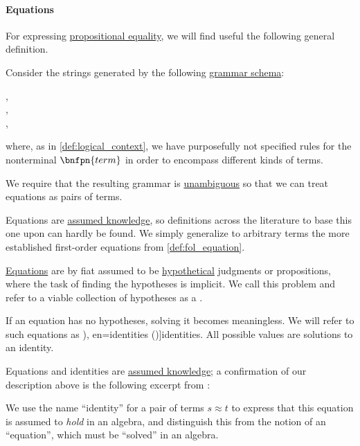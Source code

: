 \paragraph{Equations}

\begin{definition}\label{def:equation}\mimprovised
  For expressing \hyperref[con:equality]{propositional equality}, we will find useful the following general definition.

  Consider the strings generated by the following \hyperref[def:formal_grammar/schema]{grammar schema}:
  \begin{bnf*}
      {}, \\
     {}, \\
       { \bnfsp \bnftsq{\( \syneq \)} \bnfsp {}},
  \end{bnf*}
  where, as in \cref{def:logical_context}, we have purposefully not specified rules for the nonterminal \( \bnfpn{term} \) in order to encompass different kinds of terms.

  We require that the resulting grammar is \hyperref[def:grammar_ambiguity]{unambiguous} so that we can treat equations as pairs of terms.
\end{definition}
\begin{comments}
  \item Equations are \hyperref[con:assumed_knowledge]{assumed knowledge}, so definitions across the literature to base this one upon can hardly be found. We simply generalize to arbitrary terms the more established first-order equations from \cref{def:fol_equation}.
\end{comments}

\begin{problem}\label{prob:equation_solution}
  \hyperref[def:equation]{Equations} are by fiat assumed to be \hyperref[con:hypothetical_judgment]{hypothetical} judgments or propositions, where the task of finding the hypotheses is implicit. We call this problem  and refer to a viable collection of hypotheses as a .

  If an equation has no hypotheses, solving it becomes meaningless. We will refer to such equations as \term[bg=тъждества (\cite[2]{Обрешков1962ВисшаАлгебра}), en=identities (\cite[50]{BaaderNipkow2012TermRewriting})]{identities}. All possible values are solutions to an identity.
\end{problem}
\begin{comments}
  \item Equations and identities are \hyperref[con:assumed_knowledge]{assumed knowledge}; a confirmation of our description above is the following excerpt from \cite[50]{BaaderNipkow2012TermRewriting}:
  \begin{displayquote}
    We use the name \enquote{identity} for a pair of terms \( s \approx t \) to express that this equation is assumed to \textit{hold} in an algebra, and distinguish this from the notion of an \enquote{equation}, which must be \enquote{solved} in an algebra.
  \end{displayquote}
\end{comments}

